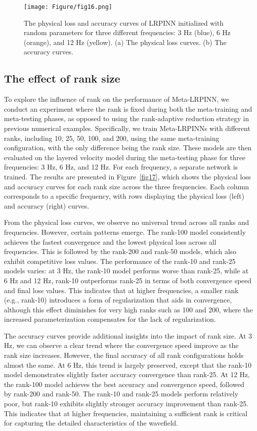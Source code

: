 \begin{figure}[htbp]
\centering
\texttt{[image: Figure/fig16.png]}
\caption{The physical loss and accuracy curves of LRPINN initialized with random parameters for three different frequencies: 3 Hz (blue), 6 Hz (orange), and 12 Hz (yellow). (a) The physical loss curves. (b) The accuracy curves.}
\label{fig16}
\end{figure}


\subsection{The effect of rank size}
To explore the influence of rank on the performance of Meta-LRPINN, we conduct an experiment where the rank is fixed during both the meta-training and meta-testing phases, as opposed to using the rank-adaptive reduction strategy in previous numerical examples. Specifically, we train Meta-LRPINNs with different ranks, including 10, 25, 50, 100, and 200, using the same meta-training configuration, with the only difference being the rank size. These models are then evaluated on the layered velocity model during the meta-testing phase for three frequencies: 3 Hz, 6 Hz, and 12 Hz. For each frequency, a separate network is trained. The results are presented in Figure~\ref{fig17}, which shows the physical loss and accuracy curves for each rank size across the three frequencies. Each column corresponds to a specific frequency, with rows displaying the physical loss (left) and accuracy (right) curves. 

From the physical loss curves, we observe no universal trend across all ranks and frequencies. However, certain patterns emerge. The rank-100 model consistently achieves the fastest convergence and the lowest physical loss across all frequencies. This is followed by the rank-200 and rank-50 models, which also exhibit competitive loss values. The performance of the rank-10 and rank-25 models varies: at 3 Hz, the rank-10 model performs worse than rank-25, while at 6 Hz and 12 Hz, rank-10 outperforms rank-25 in terms of both convergence speed and final loss values. This indicates that at higher frequencies, a smaller rank (e.g., rank-10) introduces a form of regularization that aids in convergence, although this effect diminishes for very high ranks such as 100 and 200, where the increased parameterization compensates for the lack of regularization. 

The accuracy curves provide additional insights into the impact of rank size. At 3 Hz, we can observe a clear trend where the convergence speed improve as the rank size increases. However, the final accuracy of all rank configurations holds almost the same. At 6 Hz, this trend is largely preserved, except that the rank-10 model demonstrates slightly faster accuracy convergence than rank-25. At 12 Hz, the rank-100 model achieves the best accuracy and convergence speed, followed by rank-200 and rank-50. The rank-10 and rank-25 models perform relatively poor, but rank-10 exhibits slightly stronger accuracy improvement than rank-25. This indicates that at higher frequencies, maintaining a sufficient rank is critical for capturing the detailed characteristics of the wavefield. 

